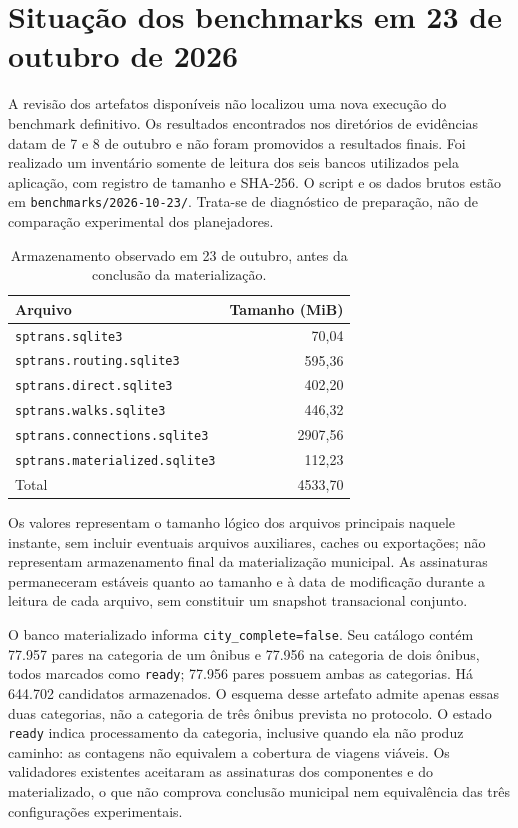 \section{Situação dos benchmarks em 23 de outubro de 2026}
A revisão dos artefatos disponíveis não localizou uma nova execução do benchmark definitivo. Os resultados encontrados nos diretórios de evidências datam de 7 e 8 de outubro e não foram promovidos a resultados finais. Foi realizado um inventário somente de leitura dos seis bancos utilizados pela aplicação, com registro de tamanho e SHA-256. O script e os dados brutos estão em \nolinkurl{benchmarks/2026-10-23/}. Trata-se de diagnóstico de preparação, não de comparação experimental dos planejadores.

\begin{table}[H]\centering
\caption{Armazenamento observado em 23 de outubro, antes da conclusão da materialização.}\label{tab:inventario-benchmark}
\begin{tabular}{lr}\hline
Arquivo & Tamanho (MiB)\\\hline
\nolinkurl{sptrans.sqlite3} & 70,04\\
\nolinkurl{sptrans.routing.sqlite3} & 595,36\\
\nolinkurl{sptrans.direct.sqlite3} & 402,20\\
\nolinkurl{sptrans.walks.sqlite3} & 446,32\\
\nolinkurl{sptrans.connections.sqlite3} & 2907,56\\
\nolinkurl{sptrans.materialized.sqlite3} & 112,23\\
\hline
Total & 4533,70\\\hline
\end{tabular}
\end{table}

Os valores representam o tamanho lógico dos arquivos principais naquele instante, sem incluir eventuais arquivos auxiliares, caches ou exportações; não representam armazenamento final da materialização municipal. As assinaturas permaneceram estáveis quanto ao tamanho e à data de modificação durante a leitura de cada arquivo, sem constituir um snapshot transacional conjunto.

O banco materializado informa \texttt{city\_complete=false}. Seu catálogo contém 77.957 pares na categoria de um ônibus e 77.956 na categoria de dois ônibus, todos marcados como \texttt{ready}; 77.956 pares possuem ambas as categorias. Há 644.702 candidatos armazenados. O esquema desse artefato admite apenas essas duas categorias, não a categoria de três ônibus prevista no protocolo. O estado \texttt{ready} indica processamento da categoria, inclusive quando ela não produz caminho: as contagens não equivalem a cobertura de viagens viáveis. Os validadores existentes aceitaram as assinaturas dos componentes e do materializado, o que não comprova conclusão municipal nem equivalência das três configurações experimentais.

